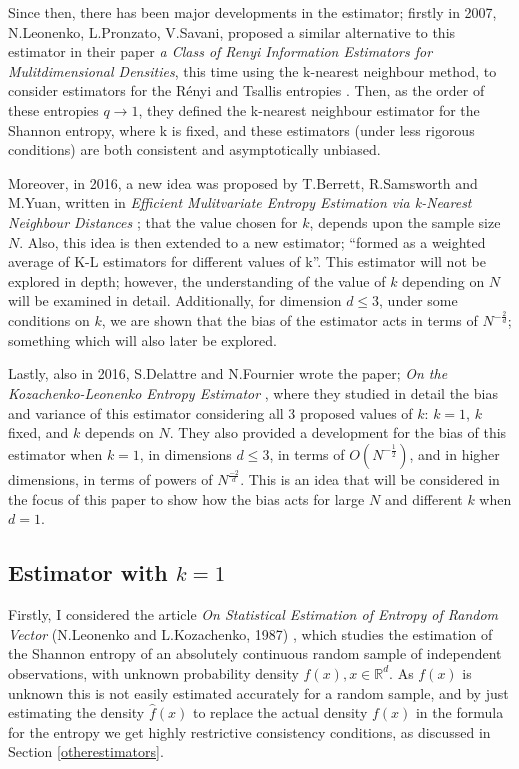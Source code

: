 \documentclass[12pt]{report}
\begin{document}
Since then, there has been major developments in the estimator; firstly in 2007, N.Leonenko, L.Pronzato, V.Savani, proposed a similar alternative to this estimator in their paper \textit{a Class of Renyi Information Estimators for Mulitdimensional Densities}, this time using the k-nearest neighbour method, to consider estimators for the R\'enyi and Tsallis entropies \cite{paper2}. Then, as the order of these entropies $q \to 1$, they defined the k-nearest neighbour estimator for the Shannon entropy, where k is fixed, and these estimators (under less rigorous conditions) are both consistent and asymptotically unbiased.

Moreover, in 2016, a new idea was proposed by T.Berrett, R.Samsworth and M.Yuan, written in \textit{Efficient Mulitvariate Entropy Estimation via k-Nearest Neighbour Distances} \cite{paper4}; that the value chosen for $k$, depends upon the sample size $N$. Also, this idea is then extended to a new estimator; ``formed as a weighted average of K-L estimators for different values of k''. This estimator will not be explored in depth; however, the understanding of the value of $k$ depending on $N$ will be examined in detail. Additionally, for dimension $d \leq 3$, under some conditions on $k$, we are shown that the bias of the estimator acts in terms of $N^{-\frac{2}{d}}$; something which will also later be explored.

Lastly, also in 2016, S.Delattre and N.Fournier wrote the paper; \textit{On the Kozachenko-Leonenko Entropy Estimator} \cite{paper3}, where they studied in detail the bias and variance of this estimator considering all 3 proposed values of $k$: $k = 1$, $k$ fixed, and $k$ depends on $N$. They also provided a development for the bias of this estimator when $k=1$, in dimensions $d \leq 3$, in terms of $O(N^{-\frac{1}{2}})$, and in higher dimensions, in terms of powers of $N^{\frac{-2}{d}}$. This is an idea that will be considered in the focus of this paper to show how the bias acts for large $N$ and different $k$ when $d=1$.


\subsection{Estimator with $k=1$}

Firstly, I considered the article \textit{On Statistical Estimation of Entropy of Random Vector} (N.Leonenko and L.Kozachenko, 1987) \cite{paper1}, which studies the estimation of the Shannon entropy of an absolutely continuous random sample of independent observations, with unknown probability density $f(x), x \in \mathbb{R}^{d}$. As $f(x)$ is unknown this is not easily estimated accurately for a random sample, and by just estimating the density $\hat{f}(x)$ to replace the actual density $f(x)$ in the formula for the entropy we get highly restrictive consistency conditions, as discussed in Section \ref{otherestimators}.
\end{document}

